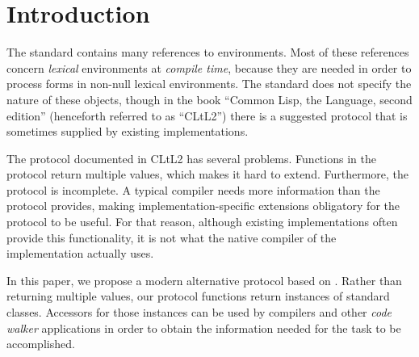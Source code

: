 \section{Introduction}

The \commonlisp{} standard \cite{ansi:common:lisp} contains many
references to environments.  Most of these references concern
\emph{lexical} environments at \emph{compile time}, because they are
needed in order to process forms in non-null lexical environments.
The standard does not specify the nature of these objects, though in
the book ``Common Lisp, the Language, second edition''
\cite{Steele:1990:CLL:95411} (henceforth referred to as ``CLtL2'')
there is a suggested protocol that is sometimes supplied by existing
\commonlisp{} implementations.

The protocol documented in CLtL2 has several problems.  Functions in
the protocol return multiple values, which makes it hard to extend.
Furthermore, the protocol is incomplete.  A typical compiler needs
more information than the protocol provides, making
implementation-specific extensions obligatory for the protocol to be
useful.  For that reason, although existing \commonlisp{}
implementations often provide this functionality, it is not what the
native compiler of the implementation actually uses.

In this paper, we propose a modern alternative protocol based on
\clos{}.  Rather than returning multiple values, our protocol
functions return instances of standard classes.  Accessors for those
instances can be used by compilers and other \emph{code walker}
applications in order to obtain the information needed for the task to
be accomplished.


